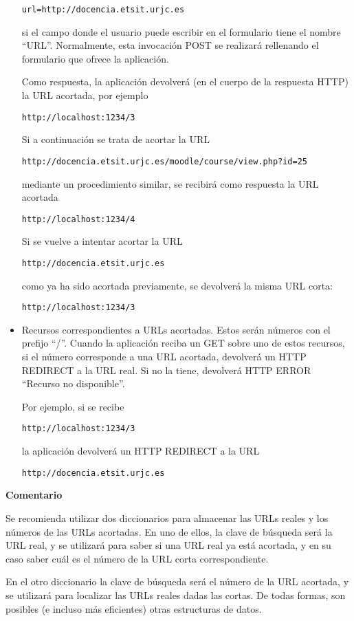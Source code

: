 \begin{itemize}
\verb|url=http://docencia.etsit.urjc.es|

si el campo donde el usuario puede escribir en el formulario tiene el nombre ``URL''. Normalmente, esta invocación POST se realizará rellenando el formulario que ofrece la aplicación.

Como respuesta, la aplicación devolverá (en el cuerpo de la respuesta HTTP) la URL acortada, por ejemplo

\verb|http://localhost:1234/3|

Si a continuación se trata de acortar la URL

\verb|http://docencia.etsit.urjc.es/moodle/course/view.php?id=25|

mediante un procedimiento similar, se recibirá como respuesta la URL acortada

\verb|http://localhost:1234/4|

Si se vuelve a intentar acortar la URL

\verb|http://docencia.etsit.urjc.es|

como ya ha sido acortada previamente, se devolverá la misma URL corta:

\verb|http://localhost:1234/3|

\item Recursos correspondientes a URLs acortadas. Estos serán números con el prefijo ``/''. Cuando la aplicación reciba un GET sobre uno de estos recursos, si el número corresponde a una URL acortada, devolverá un HTTP REDIRECT a la URL real. Si no la tiene, devolverá HTTP ERROR ``Recurso no disponible''.

Por ejemplo, si se recibe 

\verb|http://localhost:1234/3|

la aplicación devolverá un HTTP REDIRECT a la URL

\verb|http://docencia.etsit.urjc.es|

\end{itemize}

\textbf{Comentario}

Se recomienda utilizar dos diccionarios para almacenar las URLs reales y los números de las URLs acortadas. En uno de ellos, la clave de búsqueda será la URL real, y se utilizará para saber si una URL real ya está acortada, y en su caso saber cuál es el número de la URL corta correspondiente.

En el otro diccionario la clave de búsqueda será el número de la URL acortada, y se utilizará para localizar las URLs reales dadas las cortas. De todas formas, son posibles (e incluso más eficientes) otras estructuras de datos.


